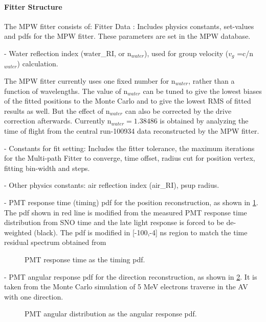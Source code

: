 \paragraph{Fitter Structure}

The MPW fitter consists of: 
 Fitter Data : Includes physics constants, set-values and pdfs for the MPW fitter. These parameters are set in the MPW database.
	
	- Water reflection index (water\_RI, or n$_{water}$), used for group velocity ($v_g$ =c/n$_{water}$) calculation. 
	
	The MPW fitter currently uses one fixed number for n$_{water}$, rather than a function of wavelengths. The value of n$_{water}$ can be tuned to give the lowest biases of the fitted positions to the Monte Carlo and to give the lowest RMS of fitted results as well. But the effect of n$_{water}$ can also be corrected by the drive correction afterwards. Currently n$_{water}=1.38486$ is obtained by analyzing the time of flight from the  central run-100934 data reconstructed by the MPW fitter. 
	
	- Constants for fit setting: Includes the fitter tolerance, the maximum iterations for the Multi-path Fitter to converge, time offset, radius cut for position vertex, fitting bin-width and steps.
	
	- Other physics constants: air reflection index (air\_RI), psup radius.
	
	- PMT response time (timing) pdf for the position reconstruction, as shown in \ref{MPW_timingPDF}. The pdf shown in red line is modified from the measured PMT response time distribution from SNO time and the late light response is forced to be de-weighted (black). The pdf is modified in [-100,-4] ns region to match the time residual spectrum obtained from %
	
	\begin{figure}[!htb]
		\centering
		\caption{PMT response time as the timing pdf.}
		\label{MPW_timingPDF}
	\end{figure}
	
	- PMT angular response pdf for the direction reconstruction, as shown in \ref{MPW_angularPDF}. It is taken from the Monte Carlo simulation of 5 MeV electrons traverse in the AV with one direction.
	
	\begin{figure}[!htb]
		\centering
		\caption{PMT angular distribution as the angular response pdf.}
		\label{MPW_angularPDF}
	\end{figure}
	
